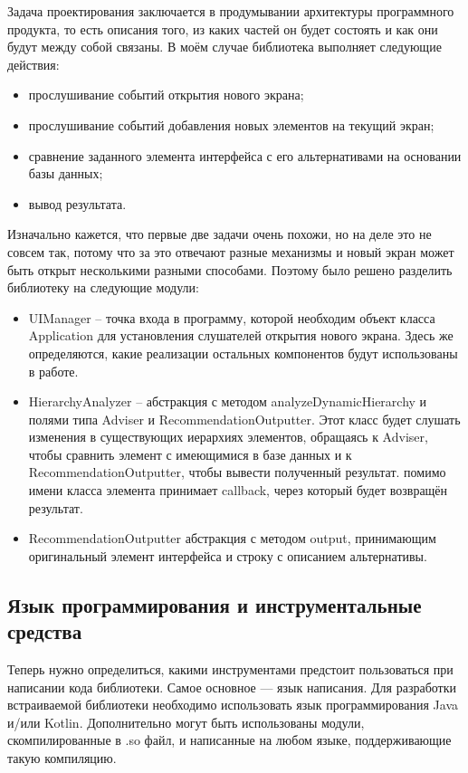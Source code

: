 \documentclass[a4paper,14pt]{extarticle} %
\begin{document}
	Задача проектирования заключается в продумывании архитектуры программного продукта, то есть описания того, из каких частей он будет состоять и как они будут между собой связаны. В моём случае библиотека выполняет следующие действия:
	\begin{itemize}
		\item прослушивание событий открытия нового экрана;
		\item прослушивание событий добавления новых элементов на текущий экран;
		\item сравнение заданного элемента интерфейса с его альтернативами на основании базы данных;
		\item вывод результата.
	\end{itemize}
	Изначально кажется, что первые две задачи очень похожи, но на деле это не совсем так, потому что за это отвечают разные механизмы и новый экран может быть открыт несколькими разными способами. Поэтому было решено разделить библиотеку на следующие модули:
	\begin{itemize}
		\item UIManager – точка входа в программу, которой необходим объект класса Application для установления слушателей открытия нового экрана. Здесь же определяются, какие реализации остальных компонентов будут использованы в работе.
		\item HierarchyAnalyzer – абстракция с методом analyzeDynamicHierarchy и полями типа Adviser и RecommendationOutputter. Этот класс будет слушать изменения в существующих иерархиях элементов, обращаясь к Adviser, чтобы сравнить элемент с имеющимися в базе данных и к RecommendationOutputter, чтобы вывести полученный результат.
помимо имени класса элемента принимает callback, через который будет возвращён результат.
		\item RecommendationOutputter абстракция с методом output, принимающим оригинальный элемент интерфейса и строку с описанием альтернативы.
	\end{itemize}
	
	\subsection{Язык программирования и  инструментальные средства}
	
	Теперь нужно определиться, какими инструментами предстоит пользоваться при написании кода библиотеки. Самое основное — язык написания. Для разработки встраиваемой библиотеки необходимо использовать язык программирования Java и/или Kotlin. Дополнительно могут быть использованы модули, скомпилированные в .so файл, и написанные на любом языке, поддерживающие такую компиляцию. 
	
\end{document}
